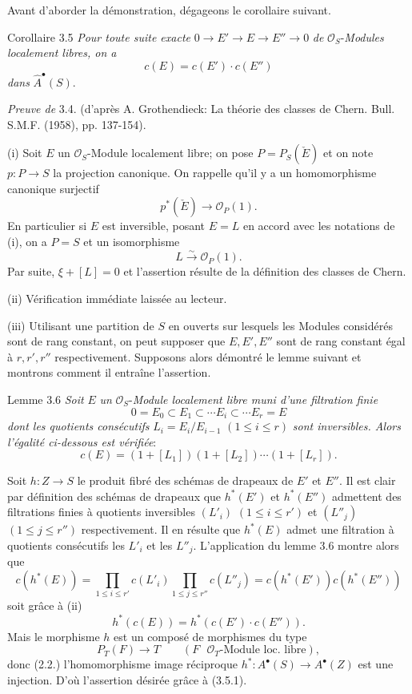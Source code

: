Avant d'aborder la démonstration, dégageons le corollaire suivant.

\begin{statement}{Corollaire 3.5}
\emph{Pour toute suite exacte} $0\to E'\to E\to E''\to0$ \emph{de} $\mathcal{O}_S$-\emph{Modules localement libres, on a}
\[
c(E)=c(E')\cdot c(E'')
\]
\emph{dans} $\widehat A^{\bullet}(S)$.
\end{statement}

\emph{Preuve de} 3.4. (d'après A. Grothendieck: La théorie des classes de Chern. Bull. S.M.F. (1958), pp. 137-154).

(i)
Soit $E$ un $\mathcal{O}_S$-Module localement libre; on pose $P=P_S(\check E)$ et on note $p:P\to S$ la projection canonique. On rappelle qu'il y a un homomorphisme canonique surjectif
\[
p^*(\check E)\longrightarrow \mathcal{O}_P(1).
\]
En particulier si $E$ est inversible, posant $E=L$ en accord avec les notations de (i), on a $P=S$ et un isomorphisme
\[
L\xrightarrow{\sim}\mathcal{O}_P(1).
\]
Par suite, $\xi+[L]=0$ et l'assertion résulte de la définition des classes de Chern.

(ii) Vérification immédiate laissée au lecteur.

(iii) Utilisant une partition de $S$ en ouverts sur lesquels les Modules considérés sont de rang constant, on peut supposer que $E,E',E''$ sont de rang constant égal à $r,r',r''$ respectivement. Supposons alors démontré le lemme suivant et montrons comment il entraîne l'assertion.

\begin{statement}{Lemme 3.6}
\emph{Soit} $E$ \emph{un} $\mathcal{O}_S$-\emph{Module localement libre muni d'une filtration finie}
\[
0=E_0\subset E_1\subset\cdots E_i\subset\cdots E_r=E
\]
\emph{dont les quotients consécutifs} $L_i=E_i/E_{i-1}$ $(1\le i\le r)$ \emph{sont inversibles. Alors l'égalité ci-dessous est vérifiée}:
\[
c(E)=(1+[L_1])(1+[L_2])\cdots(1+[L_r]).
\]
\end{statement}

Soit $h:Z\to S$ le produit fibré des schémas de drapeaux de $E'$ et $E''$. Il est clair par définition des schémas de drapeaux que $h^*(E')$ et $h^*(E'')$ admettent des filtrations finies à quotients inversibles $(L'_i)$ $(1\le i\le r')$ et $(L''_j)$ $(1\le j\le r'')$ respectivement. Il en résulte que $h^*(E)$ admet une filtration à quotients consécutifs les $L'_i$ et les $L''_j$. L'application du lemme 3.6 montre alors que
\[
c(h^*(E))=
\prod_{1\le i\le r'}c(L'_i)\prod_{1\le j\le r''}c(L''_j)
=c(h^*(E'))c(h^*(E''))
\]
soit grâce à (ii)
\[
h^*(c(E))=h^*(c(E')\cdot c(E'')).
\tag{3.5.1.}
\]
Mais le morphisme $h$ est un composé de morphismes du type
\[
P_T(F)\longrightarrow T
\qquad (F\text{ }\mathcal{O}_T\text{-Module loc. libre}),
\]
donc (2.2.) l'homomorphisme image réciproque $h^*:A^{\bullet}(S)\to A^{\bullet}(Z)$ est une injection. D'où l'assertion désirée grâce à (3.5.1).

